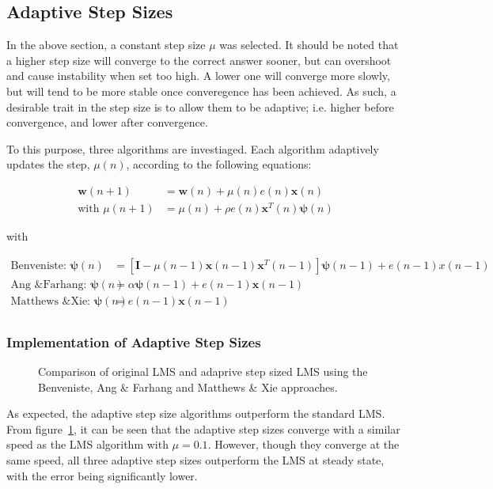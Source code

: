 \documentclass[main.tex]{subfiles}
\begin{document}
\subsection{Adaptive Step Sizes}

In the above section, a constant step size $\mu$ was selected. It should be noted that a higher step size will converge to the correct answer sooner, but can overshoot and cause instability when set too high. A lower one will converge more slowly, but will tend to be more stable once converegence has been achieved. As such, a desirable trait in the step size is to allow them to be adaptive; i.e. higher before convergence, and lower after convergence. 

To this purpose, three algorithms are investiaged. Each algorithm adaptively updates the step, $\mu(n)$, according to the following equations:

\begin{align}
\textbf{w}(n+1) &= \textbf{w}(n) + \mu(n)e(n)\textbf{x}(n)\\
\text{with\ \ \ \ } \mu(n+1) &= \mu(n) + \rho e(n) \textbf{x}^T(n)\mathbf{\psi}(n)
\end{align}

with

\begin{align*}
\text{Benveniste:\ \ }      \mathbf{\psi}(n) &= [\textbf{I} - \mu(n-1)\textbf{x}(n-1)\textbf{x}^T(n-1)]\mathbf{\psi}(n-1)+e(n-1)x(n-1)\\
\text{Ang \& Farhang:\ \ }  \mathbf{\psi}(n) &= \alpha\mathbf{\psi}(n-1) + e(n-1)\textbf{x}(n-1)\\
\text{Matthews \& Xie:\ \ } \mathbf{\psi}(n) &= e(n-1)\textbf{x}(n-1)\\
\end{align*}



	
\subsubsection{Implementation of Adaptive Step Sizes}

\begin{figure}[H]
	\centering 
	\resizebox{\textwidth}{!}{}
	\caption{Comparison of original LMS and adaprive step sized LMS using the Benveniste, Ang \& Farhang and Matthews \& Xie approaches.}
	\label{fig:q3_2_a}
\end{figure}

As expected, the adaptive step size algorithms outperform the standard LMS. From figure~\ref{fig:q3_2_a}, it can be seen that the adaptive step sizes converge with a similar speed as the LMS algorithm with $\mu = 0.1$. However, though they converge at the same speed, all three adaptive step sizes outperform the LMS at steady state, with the error being significantly lower. 
\end{document}
